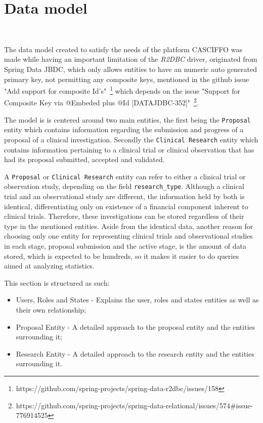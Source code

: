 \section{Data model}~\label{ch:architecture:sec:data-model}

The data model created to satisfy the needs of the platform CASCIFFO was made while having an important limitation of the \textit{R2DBC} driver, originated from Spring Data JBDC, which only allows entities to have an numeric auto generated primary key, not permitting any composite keys, mentioned in the github issue "Add support for composite Id's"~\footnote{https://github.com/spring-projects/spring-data-r2dbc/issues/158}\label{fn:gh-issue-sd-r2dbc} which depends on the issue "Support for Composite Key via @Embeded plus @Id [DATAJDBC-352]"~\footnote{https://github.com/spring-projects/spring-data-relational/issues/574\#issue-776914525}\label{fn:gh-issue-sd-relations}. 

The model is is centered around two main entities, the first being the \lstinline{Proposal} entity which contains information regarding the submission and progress of a proposal of a clinical investigation. Secondly the \lstinline{Clinical Research} entity which contains information pertaining to a clinical trial or clinical observation that has had its proposal submitted, accepted and validated.

A \lstinline{Proposal} or \lstinline{Clinical Research} entity can refer to either a clinical trial or observation study, depending on the field \lstinline{research_type}. Although a clinical trial and an observational study are different, the information held by both is identical, differentiating only on existence of a financial component inherent to clinical trials. Therefore, these investigations can be stored regardless of their type in the mentioned entities. Aside from the identical data, another reason for choosing only one entity for representing clinical trials and observational studies in each stage, proposal submission and the active stage, is the amount of data stored, which is expected to be hundreds, so it makes it easier to do queries aimed at analyzing statistics.

This section is structured as such:
\begin{itemize}
    \item Users, Roles and States - Explains the user, roles and states entities as well as their own relationship;
    \item Proposal Entity - A detailed approach to the proposal entity and the entities surrounding it;
    \item Research Entity - A detailed approach to the research entity and the entities surrounding it.
\end{itemize}


